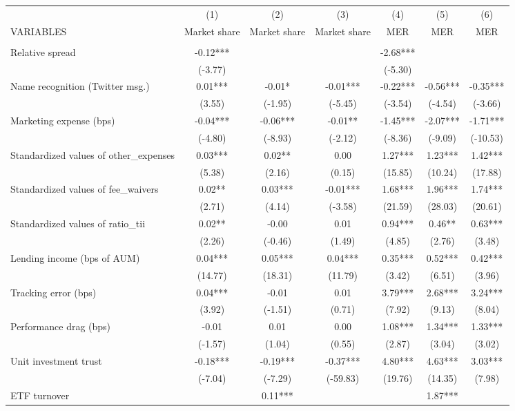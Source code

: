 \documentclass[]{article}
\begin{document}
\begin{tabular}{lcccccc} \hline
 & (1) & (2) & (3) & (4) & (5) & (6) \\
VARIABLES & Market share & Market share & Market share & MER & MER & MER \\ \hline
 &  &  &  &  &  &  \\
Relative spread & -0.12*** &  &  & -2.68*** &  &  \\
 & (-3.77) &  &  & (-5.30) &  &  \\
Name recognition (Twitter msg.) & 0.01*** & -0.01* & -0.01*** & -0.22*** & -0.56*** & -0.35*** \\
 & (3.55) & (-1.95) & (-5.45) & (-3.54) & (-4.54) & (-3.66) \\
Marketing expense (bps) & -0.04*** & -0.06*** & -0.01** & -1.45*** & -2.07*** & -1.71*** \\
 & (-4.80) & (-8.93) & (-2.12) & (-8.36) & (-9.09) & (-10.53) \\
Standardized values of other\_expenses & 0.03*** & 0.02** & 0.00 & 1.27*** & 1.23*** & 1.42*** \\
 & (5.38) & (2.16) & (0.15) & (15.85) & (10.24) & (17.88) \\
Standardized values of fee\_waivers & 0.02** & 0.03*** & -0.01*** & 1.68*** & 1.96*** & 1.74*** \\
 & (2.71) & (4.14) & (-3.58) & (21.59) & (28.03) & (20.61) \\
Standardized values of ratio\_tii & 0.02** & -0.00 & 0.01 & 0.94*** & 0.46** & 0.63*** \\
 & (2.26) & (-0.46) & (1.49) & (4.85) & (2.76) & (3.48) \\
Lending income (bps of AUM) & 0.04*** & 0.05*** & 0.04*** & 0.35*** & 0.52*** & 0.42*** \\
 & (14.77) & (18.31) & (11.79) & (3.42) & (6.51) & (3.96) \\
Tracking error (bps) & 0.04*** & -0.01 & 0.01 & 3.79*** & 2.68*** & 3.24*** \\
 & (3.92) & (-1.51) & (0.71) & (7.92) & (9.13) & (8.04) \\
Performance drag (bps) & -0.01 & 0.01 & 0.00 & 1.08*** & 1.34*** & 1.33*** \\
 & (-1.57) & (1.04) & (0.55) & (2.87) & (3.04) & (3.02) \\
Unit investment trust & -0.18*** & -0.19*** & -0.37*** & 4.80*** & 4.63*** & 3.03*** \\
 & (-7.04) & (-7.29) & (-59.83) & (19.76) & (14.35) & (7.98) \\
ETF turnover &  & 0.11*** &  &  & 1.87*** &  \\

\end{tabular}
\end{document}
